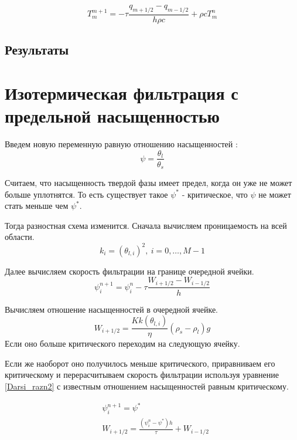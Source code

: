 \documentclass[12pt,a4paper]{article}
\begin{document}
\begin{equation}
T_m^{m+1} = - \tau\frac{q_{m+1/2} - q_{m-1/2}}{h\rho c} + \rho c T_m^n
\label{termal_razn_2}
\end{equation}

\subsection{Результаты}

\newpage
\section{Изотермическая фильтрация с предельной насыщенностью}
Введем новую переменную равную отношению насыщенностей : 
$$
\psi = \frac{\theta_l}{\theta_s} 
$$

Считаем, что насыщенность твердой фазы имеет предел, когда он уже не может больше уплотнятся. То есть существует такое $ \psi^* $ - критическое, что $\psi $ не может стать меньше чем $\psi^*$. 

Тогда разностная схема изменится. 
Сначала вычисляем проницаемость на всей области.
\begin{equation}
k_i = (\theta_{l,i})^2 , \ i = 0,  \dots ,M-1
\label{perm_razn2}
\end{equation}

Далее вычисляем скорость фильтрации на границе очередной ячейки.
\begin{equation}
\psi_i^{n+1} = \psi_i^n - \tau\frac{W_{i+1/2} - W_{i-1/2}}{h}
\label{filtr_razn2}
\end{equation}

Вычисляем отношение насыщенностей в очередной ячейке. 
\begin{equation}
W_{i+1/2} = \frac{K k(\theta_{l,i})}{\eta}(\rho_s-\rho_l)g
\label{Darsi_razn2}
\end{equation}
Если оно больше критического переходим на следующую ячейку.

Если же наоборот оно получилось меньше критического, приравниваем его критическому и перерасчитываем скорость фильтрации используя уравнение \eqref{Darsi_razn2} с известным отношением насыщенностей равным критическому.

\begin{equation}
\begin{aligned}
&\psi_{i}^{n+1} = \psi^* \\
&W_{i+1/2} = \frac{(\psi_i^n - \psi^*)h}{\tau} + W_{i-1/2} \\
\end{aligned}
\label{corr_razn}
\end{equation}
\end{document}
